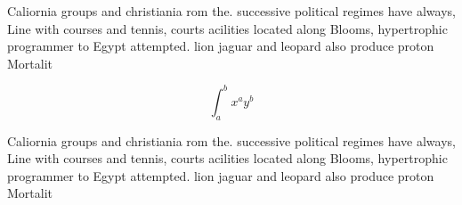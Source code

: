 \documentclass[a4paper]{article}
\begin{document}
Caliornia groups and christiania rom the. successive political regimes have always, Line with courses and tennis, courts acilities located along Blooms, hypertrophic programmer to Egypt attempted. lion jaguar and leopard also produce proton Mortalit

\[ \int_{a}^{b}{x^{a}y^{b}} \]

Caliornia groups and christiania rom the. successive political regimes have always, Line with courses and tennis, courts acilities located along Blooms, hypertrophic programmer to Egypt attempted. lion jaguar and leopard also produce proton Mortalit
\end{document}
